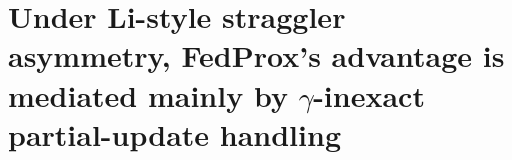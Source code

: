 \documentclass[11pt,a4paper]{report}
\begin{document}
\begin{table}[H]
\centering
\small
\caption{Per-class validation F1 mean across the $\mu$ sweep on the
engineered partition, $n = 10$ paired seeds per cell. SDs across seeds
range $0.003$ (mel-nevi) to $0.113$ (rare classes). ``$\Delta$ at $\mu=1.0$''
is the absolute per-class F1 deficit at the catastrophic cell relative to
the FedAvg baseline ($\mu = 0$). The deficit concentrates in rare and
minority classes; the dominant mel-nevi class is essentially invariant.
Source: \texttt{mu\_sensitivity\_flower/}.}
\label{tab:mu-per-class}
\end{table}





\section{Under Li-style straggler asymmetry, FedProx's advantage is mediated
mainly by $\gamma$-inexact partial-update handling}
\label{sec:li-straggler}
\end{document}
